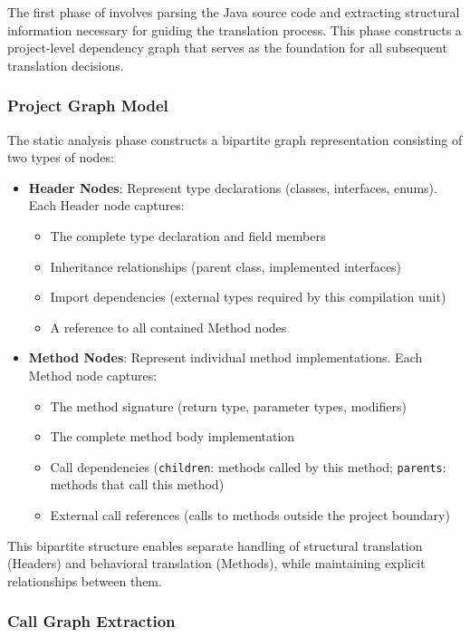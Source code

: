 The first phase of \tool{} involves parsing the Java source code and extracting structural information necessary for guiding the translation process. This phase constructs a project-level dependency graph that serves as the foundation for all subsequent translation decisions.

\subsubsection{Project Graph Model}

The static analysis phase constructs a bipartite graph representation consisting of two types of nodes:

\begin{itemize}
\item \textbf{Header Nodes}: Represent type declarations (classes, interfaces, enums). Each Header node captures:
\begin{itemize}
\item The complete type declaration and field members
\item Inheritance relationships (parent class, implemented interfaces)
\item Import dependencies (external types required by this compilation unit)
\item A reference to all contained Method nodes
\end{itemize}

\item \textbf{Method Nodes}: Represent individual method implementations. Each Method node captures:
\begin{itemize}
\item The method signature (return type, parameter types, modifiers)
\item The complete method body implementation
\item Call dependencies (\texttt{children}: methods called by this method; \texttt{parents}: methods that call this method)
\item External call references (calls to methods outside the project boundary)
\end{itemize}
\end{itemize}

This bipartite structure enables separate handling of structural translation (Headers) and behavioral translation (Methods), while maintaining explicit relationships between them.

\subsubsection{Call Graph Extraction}

